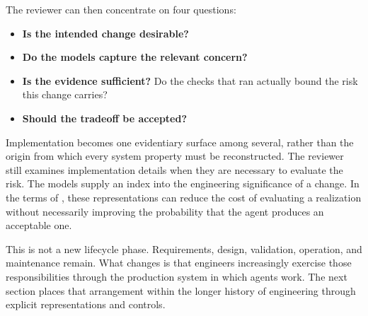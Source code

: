 The reviewer can then concentrate on four questions:

\begin{itemize}
\tightlist
\item
  \textbf{Is the intended change desirable?}
\item
  \textbf{Do the models capture the relevant concern?}
\item
  \textbf{Is the evidence sufficient?} Do the checks that ran actually bound the risk this change carries?
\item
  \textbf{Should the tradeoff be accepted?}
\end{itemize}

Implementation becomes one evidentiary surface among several, rather than the origin from which every system property must be reconstructed. The reviewer still examines implementation details when they are necessary to evaluate the risk. The models supply an index into the engineering significance of a change. In the terms of , these representations can reduce the cost of evaluating a realization without necessarily improving the probability that the agent produces an acceptable one.


This is not a new lifecycle phase. Requirements, design, validation, operation, and maintenance remain. What changes is that engineers increasingly exercise those responsibilities through the production system in which agents work. The next section places that arrangement within the longer history of engineering through explicit representations and controls.
